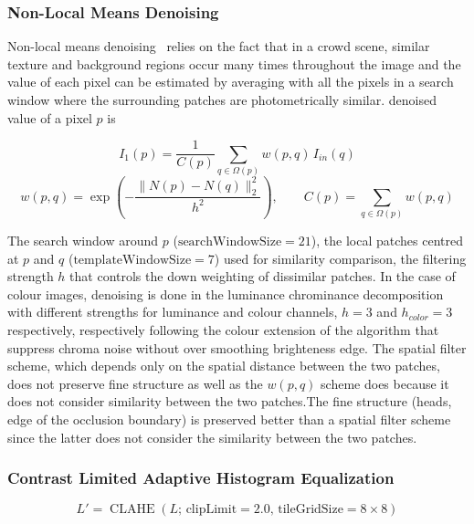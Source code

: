 \subsubsection{Non-Local Means Denoising}

Non-local means denoising~\cite{buades2005nonlocal} relies on the fact that in a crowd scene, similar texture and background regions occur many times throughout the image and the value of each pixel can be estimated by averaging with all the pixels in a search window where the surrounding patches are photometrically similar. denoised value of a pixel $p$ is

\begin{equation}
	I_{1}(p) = \frac{1}{C(p)} \sum_{q \in \Omega(p)} w(p,q)\, I_{in}(q)
	\label{eq:nlm-estimate}
\end{equation}
\begin{equation}
	w(p,q) = \exp\left(-\frac{\lVert N(p) - N(q) \rVert_2^2}{h^2}\right), \qquad C(p) = \sum_{q \in \Omega(p)} w(p,q)
	\label{eq:nlm-weight}
\end{equation}

The search window around $p$ ($\text{searchWindowSize}=21$), the local patches centred at $p$ and $q$ ($\text{templateWindowSize}=7$) used for similarity comparison, the filtering strength $h$ that controls the down weighting of dissimilar patches. In the case of colour images, denoising is done in the luminance chrominance decomposition with different strengths for luminance and colour channels, $h=3$ and $h_{color}=3$ respectively, respectively following the colour extension of the algorithm that suppress chroma noise without over smoothing brighteness edge. The spatial filter scheme, which depends only on the spatial distance between the two patches, does not preserve fine structure as well as the $w(p,q)$ scheme does because it does not consider similarity between the two patches.The fine structure (heads, edge of the occlusion boundary) is preserved better than a spatial filter scheme since the latter does not consider the similarity between the two patches. 

\subsubsection{Contrast Limited Adaptive Histogram Equalization}

\begin{equation}
	L' =
	\operatorname{CLAHE}\left(
	L;\,\text{clipLimit}=2.0,\,
	\text{tileGridSize}=8\times8
	\right)
	\label{eq:clahe}
\end{equation}

